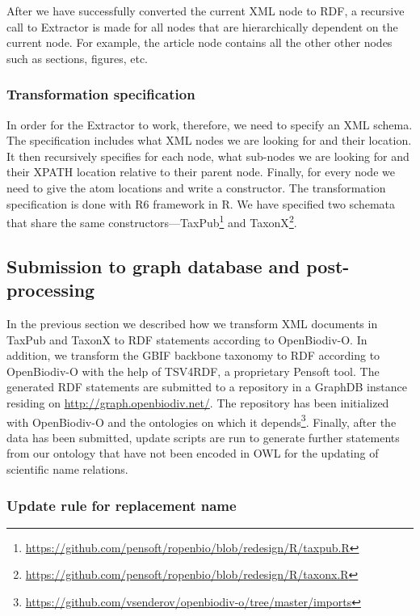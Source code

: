 After we have successfully converted the current XML node to RDF, a recursive call to Extractor is made for all nodes that are hierarchically dependent on the current node. For example, the article node contains all the other other nodes such as sections, figures, etc.

\subsubsection{Transformation specification}

In order for the Extractor to work, therefore, we need to specify an XML schema. The specification includes what XML nodes we are looking for and their location. It then recursively specifies for each node, what sub-nodes we are looking for and their XPATH location relative to their parent node. Finally, for every node we need to give the atom locations and write a constructor. The transformation specification is done with R6 framework in R. We have specified two schemata that share the same constructors---TaxPub\footnote{\url{https://github.com/pensoft/ropenbio/blob/redesign/R/taxpub.R}} and TaxonX\footnote{\url{https://github.com/pensoft/ropenbio/blob/redesign/R/taxonx.R}}.

\subsection{Submission to graph database and post-processing}

In the previous section we described how we transform XML documents in TaxPub and TaxonX to RDF statements according to OpenBiodiv-O. In addition, we transform the GBIF backbone taxonomy to RDF according to OpenBiodiv-O with the help of TSV4RDF, a proprietary Pensoft tool. The generated RDF statements are submitted to a repository in a GraphDB instance residing on \url{http://graph.openbiodiv.net/}. The repository has been initialized with OpenBiodiv-O and the ontologies on which it depends\footnote{\url{https://github.com/vsenderov/openbiodiv-o/tree/master/imports}}. Finally, after the data has been submitted, update scripts are run to generate further statements from our ontology that have not been encoded in OWL for the updating of scientific name relations.

\subsubsection{Update rule for replacement name}

